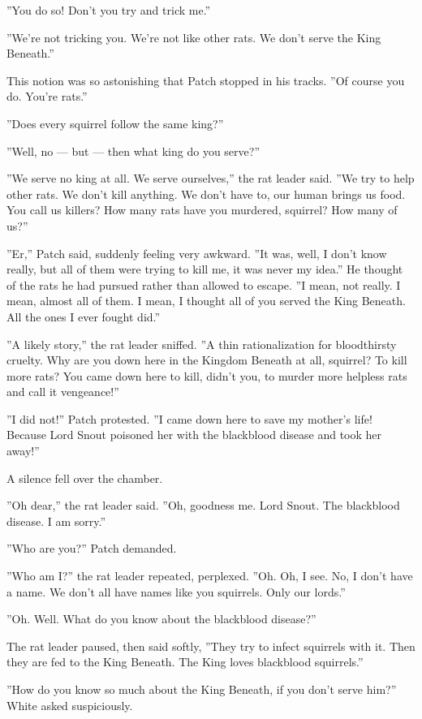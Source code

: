 \documentclass[12pt]{book}
\begin{document}
''You do so! Don't you try and trick me.''

''We're not tricking you. We're not like other rats. We don't serve
the King Beneath.''

This notion was so astonishing that Patch stopped in his tracks. ''Of
course you do. You're rats.''

''Does every squirrel follow the same king?''

''Well, no --- but --- then what king do you serve?''

''We serve no king at all. We serve ourselves,'' the rat leader
said. ''We try to help other rats. We don't kill anything. We don't
have to, our human brings us food. You call us killers? How many rats
have you murdered, squirrel? How many of us?''

''Er,'' Patch said, suddenly feeling very awkward. ''It was, well, I
don't know really, but all of them were trying to kill me, it was
never my idea.'' He thought of the rats he had pursued rather than
allowed to escape. ''I mean, not really. I mean, almost all of them. I
mean, I thought all of you served the King Beneath. All the ones I
ever fought did.''

''A likely story,'' the rat leader sniffed. ''A thin rationalization
for bloodthirsty cruelty. Why are you down here in the Kingdom Beneath
at all, squirrel? To kill more rats? You came down here to kill,
didn't you, to murder more helpless rats and call it vengeance!''

''I did not!'' Patch protested. ''I came down here to save my mother's
life! Because Lord Snout poisoned her with the blackblood disease and
took her away!''

A silence fell over the chamber.

''Oh dear,'' the rat leader said. ''Oh, goodness me. Lord Snout. The
blackblood disease. I am sorry.''

''Who are you?'' Patch demanded.

''Who am I?'' the rat leader repeated, perplexed. ''Oh. Oh, I see. No,
I don't have a name. We don't all have names like you squirrels. Only
our lords.''

''Oh. Well. What do you know about the blackblood disease?''

The rat leader paused, then said softly, ''They try to infect
squirrels with it. Then they are fed to the King Beneath. The King
loves blackblood squirrels.''

''How do you know so much about the King Beneath, if you don't serve
him?'' White asked suspiciously.
\end{document}
